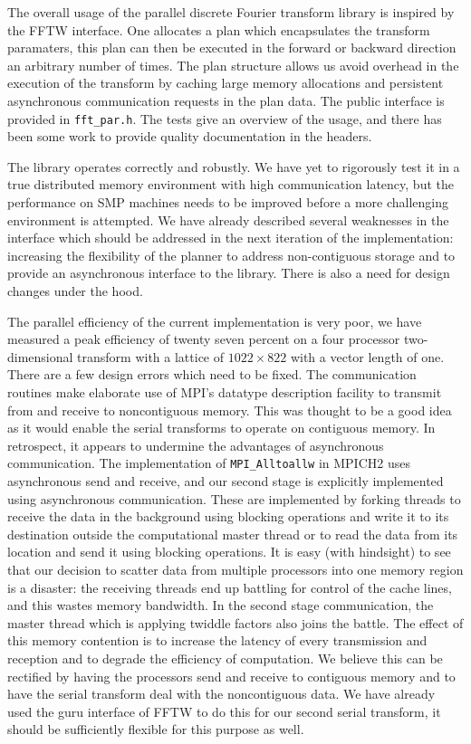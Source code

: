 \documentclass{article}
\theoremstyle{definition}
\begin{document}
The overall usage of the parallel discrete Fourier transform library is inspired
by the FFTW interface. One allocates a plan which encapsulates the transform
paramaters, this plan can then be executed in the forward or backward direction
an arbitrary number of times. The plan structure allows us avoid overhead in the
execution of the transform by caching large memory allocations and persistent
asynchronous communication requests in the plan data. The public interface is
provided in \texttt{fft\_par.h}. The tests give an overview of the usage, and
there has been some work to provide quality documentation in the headers.

The library operates correctly and robustly. We have yet to rigorously test it
in a true distributed memory environment with high communication latency, but
the performance on SMP machines needs to be improved before a more challenging
environment is attempted. We have already described several weaknesses in the
interface which should be addressed in the next iteration of the implementation:
increasing the flexibility of the planner to address non-contiguous storage and
to provide an asynchronous interface to the library.  There is also a need for
design changes under the hood.

The parallel efficiency of the current implementation is very poor, we have
measured a peak efficiency of twenty seven percent on a four processor
two-dimensional transform with a lattice of $1022\times 822$ with a vector
length of one. There are a few design errors which need to be fixed. The
communication routines make elaborate use of MPI's datatype description facility
to transmit from and receive to noncontiguous memory. This was thought to be a
good idea as it would enable the serial transforms to operate on contiguous
memory. In retrospect, it appears to undermine the advantages of asynchronous
communication. The implementation of \texttt{MPI\_Alltoallw} in MPICH2 uses
asynchronous send and receive, and our second stage is explicitly implemented
using asynchronous communication. These are implemented by forking threads to
receive the data in the background using blocking operations and write it to its
destination outside the computational master thread or to read the data from its
location and send it using blocking operations. It is easy (with hindsight) to
see that our decision to scatter data from multiple processors into one memory
region is a disaster: the receiving threads end up battling for control of the
cache lines, and this wastes memory bandwidth. In the second stage
communication, the master thread which is applying twiddle factors also joins
the battle. The effect of this memory contention is to increase the latency of
every transmission and reception and to degrade the efficiency of computation.
We believe this can be rectified by having the processors send and receive to
contiguous memory and to have the serial transform deal with the noncontiguous
data. We have already used the guru interface of FFTW to do this for our second
serial transform, it should be sufficiently flexible for this purpose as well.


\end{document}
